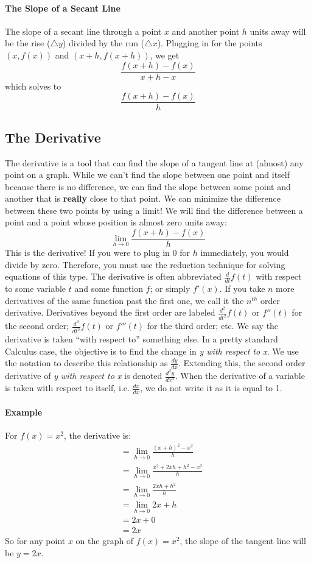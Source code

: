 \documentclass[../revisedmain.tex]{subfiles}
\begin{document}
	\paragraph{The Slope of a Secant Line} The slope of a secant line through a point $x$ and another point $h$ units away will be the rise ($\triangle y$) divided by the run ($\triangle x$). Plugging in for the points $(x,f(x))$ and $(x+h,f(x+h))$, we get $$\frac{f(x+h)-f(x)}{x+h-x}$$which solves to$$\frac{f(x+h)-f(x)}{h}$$
	\subsection{The Derivative}
	\par The derivative is a tool that can find the slope of a tangent line at (almost) any point on a graph. While we can't find the slope between one point and itself because there is no difference, we can find the slope between some point and another that is \textbf{really} close to that point. We can minimize the difference between these two points by using a limit! We will find the difference between a point and a point whose position is almost zero units away: $$\lim_{h\to 0} \frac{f(x+h)-f(x)}{h}$$ This is the derivative! If you were to plug in 0 for $h$ immediately, you would divide by zero. Therefore, you must use the reduction technique for solving equations of this type. The derivative is often abbreviated $\displaystyle\frac{d}{dt} f(t)$ with respect to some variable $t$ and some function $f$; or simply $f'(x)$. If you take $n$ more derivatives of the same function past the first one, we call it the $n^{th}$ order derivative. Derivatives beyond the first order are labeled $\displaystyle\frac{d^2}{dt^2} f(t)$ or $f''(t)$ for the second order; $\displaystyle\frac{d^3}{dt^3} f(t)$ or $f'''(t)$ for the third order; etc. We say the derivative is taken ``with respect to'' something else. In a pretty standard Calculus case, the objective is to find the change in  \textit{y with respect to x}. We use the notation to describe this relationship as $\displaystyle\frac{dy}{dx}$. Extending this, the second order derivative of \textit{y with respect to x} is denoted $\displaystyle\frac{d^2y}{dx^2}$. When the derivative of a variable is taken with respect to itself, i.e. $\displaystyle\frac{dx}{dx}$, we do not write it as it is equal to 1.
	\paragraph {Example} For $f(x)=x^2$, the derivative is:
	\begin{equation}
	\begin{split}
	&= \lim_{h\to 0} \frac{(x+h)^2-x^2}{h} \\
	&= \lim_{h\to 0} \frac{x^2+2xh+h^2-x^2}{h} \\
	&= \lim_{h\to 0} \frac{2xh+h^2}{h} \\
	&= \lim_{h\to 0} 2x+h \\
	&= 2x+0 \\
	&= 2x
	\end{split}
	\end{equation}
	So for any point $x$ on the graph of $f(x)=x^2$, the slope of the tangent line will be $y=2x$.
\end{document}
